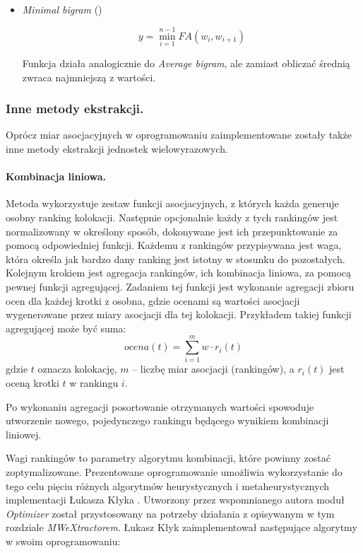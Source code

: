 \documentclass[11pt,a4paper]{llncs}
\begin{document}
\begin{itemize}
\item \emph{Minimal bigram} (\cite{paradowski_beta})

$$ y = \min^{n-1}_{i=1}FA(w_{i}, w_{i+1}) $$


Funkcja działa analogicznie do \emph{Average bigram}, ale zamiast obliczać średnią zwraca najmniejszą z wartości.

\end{itemize}


\subsubsection{Inne metody ekstrakcji.}

Oprócz miar asocjacyjnych w oprogramowaniu zaimplementowane zostały także inne metody ekstrakcji jednostek wielowyrazowych.


\paragraph{Kombinacja liniowa.}

Metoda wykorzystuje zestaw funkcji asocjacyjnych, z których każda generuje osobny ranking kolokacji.
Następnie opcjonalnie każdy z tych rankingów jest normalizowany w określony sposób, dokonywane jest ich przepunktowanie za pomocą odpowiedniej funkcji.
Każdemu z rankingów przypisywana jest waga, która określa jak bardzo dany ranking jest istotny w stosunku do pozostałych.
Kolejnym krokiem jest agregacja rankingów, ich kombinacja liniowa, za pomocą pewnej funkcji agregującej.
Zadaniem tej funkcji jest wykonanie agregacji zbioru ocen dla każdej krotki z osobna, gdzie ocenami są wartości asocjacji wygenerowane przez miary asocjacji dla tej kolokacji.
Przykładem takiej funkcji agregującej może być suma:
$$ ocena(t) = \sum_{i=1}^{m} w \cdot r_{i}(t) $$
gdzie $t$ oznacza kolokację, $m$ -- liczbę miar asocjacji (rankingów), a $r_{i}(t)$ jest oceną krotki $t$ w rankingu $i$.

Po wykonaniu agregacji posortowanie otrzymanych wartości spowoduje utworzenie nowego, pojedynczego rankingu będącego wynikiem kombinacji liniowej.


Wagi rankingów to parametry algorytmu kombinacji, które powinny zostać zoptymalizowane.
Prezentowane oprogramowanie umożliwia wykorzystanie do tego celu pięciu różnych algorytmów heurystycznych i metaheurystycznych implementacji Łukasza Kłyka \cite{klyk}.
Utworzony przez wspomnianego autora moduł \emph{Optimizer} został przystosowany na potrzeby działania z opisywanym w tym rozdziale \emph{MWeXtractorem}.
Łukasz Kłyk zaimplementował następujące algorytmy w swoim oprogramowaniu:
\end{document}
